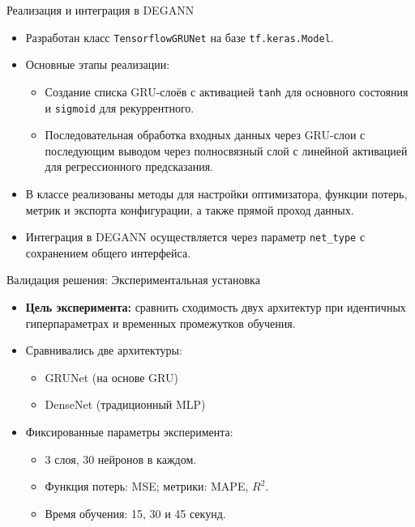 \documentclass
  [ russian
  , aspectratio=1610 %
  ] {beamer}
\begin{document}
\begin{frame}{Реализация и интеграция в DEGANN}
    \begin{itemize}
        \item Разработан класс \texttt{TensorflowGRUNet} на базе \texttt{tf.keras.Model}.
        \item Основные этапы реализации:
              \begin{itemize}
                  \item Создание списка GRU-слоёв с активацией \texttt{tanh} для основного состояния и \texttt{sigmoid} для рекуррентного.
                  \item Последовательная обработка входных данных через GRU-слои с последующим выводом через полносвязный слой с линейной активацией для регрессионного предсказания.
              \end{itemize}
        \item В классе реализованы методы для настройки оптимизатора, функции потерь, метрик и экспорта конфигурации, а также прямой проход данных.
        \item Интеграция в DEGANN осуществляется через параметр \texttt{net\_type} с сохранением общего интерфейса.
    \end{itemize}
\end{frame}

\begin{frame}{Валидация решения: Экспериментальная установка}
    \begin{itemize}
        \item \textbf{Цель эксперимента:} сравнить сходимость двух архитектур при идентичных гиперпараметрах и временных промежутков обучения.
        \item Сравнивались две архитектуры:
              \begin{itemize}
                  \item GRUNet (на основе GRU)
                  \item DenseNet (традиционный MLP)
              \end{itemize}
        \item Фиксированные параметры эксперимента:
              \begin{itemize}
                  \item 3 слоя, 30 нейронов в каждом.
                  \item Функция потерь: MSE; метрики: MAPE, \(R^2\).
                  \item Время обучения: 15, 30 и 45 секунд.
              \end{itemize}
    \end{itemize}
\end{frame}
\end{document}
